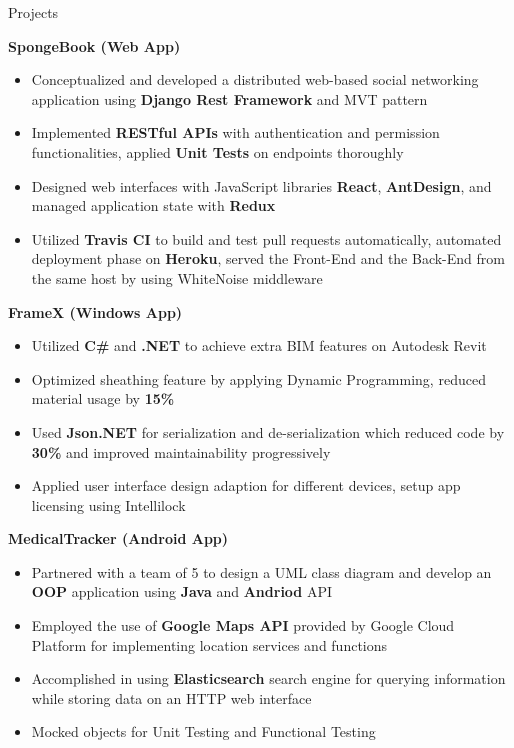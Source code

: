 \documentclass{resume} %
\begin{document}
\begin{rSection}{Projects}

{\bf SpongeBook (Web App)}
\begin{itemize}
\item Conceptualized and developed a distributed web-based social networking application using \textbf{Django Rest Framework} and MVT pattern
\item Implemented \textbf{RESTful APIs} with authentication and permission functionalities, applied \textbf{Unit Tests} on endpoints thoroughly
\item Designed web interfaces with JavaScript libraries \textbf{React}, \textbf{AntDesign}, and managed application state with \textbf{Redux}
\item Utilized \textbf{Travis CI} to build and test pull requests automatically, automated deployment phase on \textbf{Heroku}, served the Front-End and the Back-End from the same host by using WhiteNoise middleware
\end{itemize}

{\bf FrameX  (Windows App)}
\begin{itemize}
\item Utilized \textbf{C\#} and \textbf{.NET} to achieve extra BIM features on Autodesk Revit
\item Optimized sheathing feature by applying Dynamic Programming, reduced material usage by \textbf{15\%}
\item  Used \textbf{Json.NET} for serialization and de-serialization which reduced code by \textbf{30\%}  and improved maintainability progressively
\item Applied user interface design adaption for different devices, setup app licensing using Intellilock
\end{itemize}

{\bf MedicalTracker (Android  App)}
\begin{itemize}
\item Partnered with a team of 5 to design a UML class diagram and develop an \textbf{OOP} application using \textbf{Java} and \textbf{Andriod} API
\item Employed the use of \textbf{Google Maps API} provided by Google Cloud Platform for implementing location services and functions
\item Accomplished in using \textbf{Elasticsearch} search engine for querying information while storing data on an HTTP web interface
\item Mocked objects for Unit Testing and Functional Testing
\end{itemize}
\end{rSection}
\end{document}
